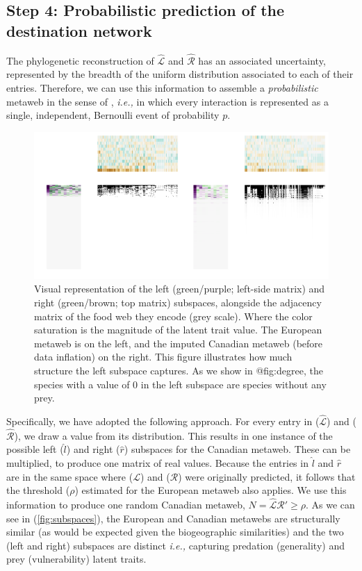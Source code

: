 \begin{refsection}
\subsection{Step 4: Probabilistic prediction of the destination
network}\label{step-4-probabilistic-prediction-of-the-destination-network}

The phylogenetic reconstruction of \(\hat{\mathscr{L}}\) and
\(\hat{\mathscr{R}}\) has an associated uncertainty, represented by the
breadth of the uniform distribution associated to each of their entries.
Therefore, we can use this information to assemble a
\emph{probabilistic} metaweb in the sense of \cite{Poisot2016Structure},
\emph{i.e.,} in which every interaction is represented as a single,
independent, Bernoulli event of probability \(p\).

\begin{figure}[h]
    \centering
    \includegraphics[width=\textwidth]{figures/figure-subspaces.png}
    \caption{Visual representation of the left (green/purple; left-side
matrix) and right (green/brown; top matrix) subspaces, alongside the
adjacency matrix of the food web they encode (grey scale). Where the
color saturation is the magnitude of the latent trait value. The
European metaweb is on the left, and the imputed Canadian metaweb
(before data inflation) on the right. This figure illustrates how much
structure the left subspace captures. As we show in @fig:degree, the
species with a value of 0 in the left subspace are species without any
prey.}
    \label{fig:subspaces}
\end{figure}

Specifically, we have adopted the following approach. For every entry in
($\hat{\mathscr{L}}$) and ($\hat{\mathscr{R}}$), we draw a value from
its distribution. This results in one instance of the possible left
($\hat{l}$) and right ($\hat{r}$) subspaces for
the Canadian metaweb. These can be multiplied, to produce one matrix of
real values. Because the entries in $\hat{l}$ and
$\hat{r}$ are in the same space where ($\mathscr{L}$) and
($\mathscr{R}$) were originally predicted, it follows that the threshold
($\rho$) estimated for the European metaweb also applies. We use this
information to produce one random Canadian metaweb,
\(N = \hat{\mathscr{L}}\hat{\mathscr{R}}' \ge \rho\). As we can see in
(\autoref{fig:subspaces}), the European and Canadian metawebs are structurally
similar (as would be expected given the biogeographic similarities) and
the two (left and right) subspaces are distinct \emph{i.e.,} capturing
predation (generality) and prey (vulnerability) latent traits.


\end{refsection}

